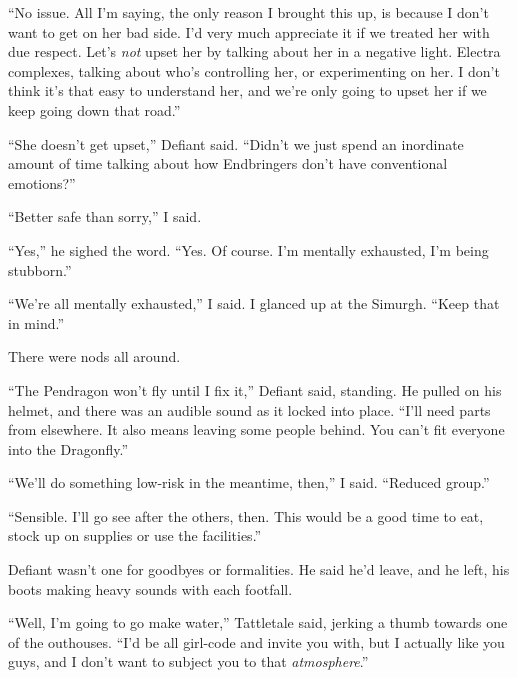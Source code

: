 ``No issue.  All I'm saying, the only reason I brought this up, is because I don't want to get on her bad side.  I'd very much appreciate it if we treated her with due respect.  Let's \emph{not} upset her by talking about her in a negative light.  Electra complexes, talking about who's controlling her, or experimenting on her.  I don't think it's that easy to understand her, and we're only going to upset her if we keep going down that road.''



``She doesn't get upset,'' Defiant said.  ``Didn't we just spend an inordinate amount of time talking about how Endbringers don't have conventional emotions?''



``Better safe than sorry,'' I said.



``Yes,'' he sighed the word.  ``Yes.  Of course.  I'm mentally exhausted, I'm being stubborn.''



``We're all mentally exhausted,'' I said.  I glanced up at the Simurgh.  ``Keep that in mind.''



There were nods all around.



``The Pendragon won't fly until I fix it,'' Defiant said, standing.  He pulled on his helmet, and there was an audible sound as it locked into place.  ``I'll need parts from elsewhere.  It also means leaving some people behind.  You can't fit everyone into the Dragonfly.''



``We'll do something low-risk in the meantime, then,'' I said.  ``Reduced group.''



``Sensible.  I'll go see after the others, then.  This would be a good time to eat, stock up on supplies or use the facilities.''



Defiant wasn't one for goodbyes or formalities.  He said he'd leave, and he left, his boots making heavy sounds with each footfall.



``Well, I'm going to go make water,'' Tattletale said, jerking a thumb towards one of the outhouses.  ``I'd be all girl-code and invite you with, but I actually like you guys, and I don't want to subject you to that \emph{atmosphere}.''



